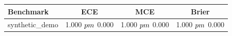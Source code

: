 \begin{tabular}{lccc}
\toprule
Benchmark & ECE & MCE & Brier \\
\midrule
synthetic_demo & 1.000 $\\pm$ 0.000 & 1.000 $\\pm$ 0.000 & 1.000 $\\pm$ 0.000 \\
\bottomrule
\end{tabular}
